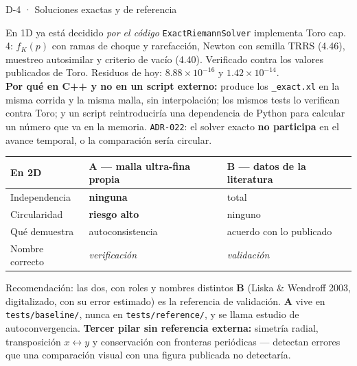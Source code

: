 \documentclass[aspectratio=169,10pt]{beamer}
\newcommand{\cod}[1]{\texttt{\small #1}}
\begin{document}
\begin{frame}[shrink]{D-4 · Soluciones exactas y de referencia}

  \begin{block}{En 1D ya está decidido \emph{por el código}}
    \scriptsize
    \cod{ExactRiemannSolver} implementa Toro cap. 4: $f_K(p)$ con ramas de choque
    y rarefacción, Newton con semilla TRRS (4.46), muestreo autosimilar y criterio
    de vacío (4.40). Verificado contra los valores publicados de Toro.
    Residuos de hoy: $8.88\times10^{-16}$ y $1.42\times10^{-14}$.
    \\[3pt]
    \textbf{Por qué en C++ y no en un script externo:} produce los \cod{*\_exact.xl}
    en la misma corrida y la misma malla, sin interpolación; los mismos tests lo
    verifican contra Toro; y un script reintroduciría una dependencia de Python
    para calcular un número que va en la memoria. \cod{ADR-022}: el solver exacto
    \textbf{no participa} en el avance temporal, o la comparación sería circular.
  \end{block}

  \centering\scriptsize
  \begin{tabular}{@{}lll@{}}
    \toprule
    \textbf{En 2D} & \textbf{A — malla ultra-fina propia} & \textbf{B — datos de la literatura} \\
    \midrule
    Independencia  & \textbf{ninguna} & total \\
    Circularidad   & \textbf{riesgo alto} & ninguno \\
    Qué demuestra  & autoconsistencia & acuerdo con lo publicado \\
    Nombre correcto& \emph{verificación} & \emph{validación} \\
    \bottomrule
  \end{tabular}

  \vspace{0.4em}
  \begin{exampleblock}{Recomendación: las dos, con roles y nombres distintos}
    \scriptsize
    \textbf{B} (Liska \& Wendroff 2003, digitalizado, con su error estimado) es la
    referencia de validación. \textbf{A} vive en \cod{tests/baseline/}, nunca en
    \cod{tests/reference/}, y se llama estudio de autoconvergencia.
    \textbf{Tercer pilar sin referencia externa:} simetría radial, transposición
    $x\leftrightarrow y$ y conservación con fronteras periódicas — detectan errores
    que una comparación visual con una figura publicada no detectaría.
  \end{exampleblock}
\end{frame}
\end{document}
